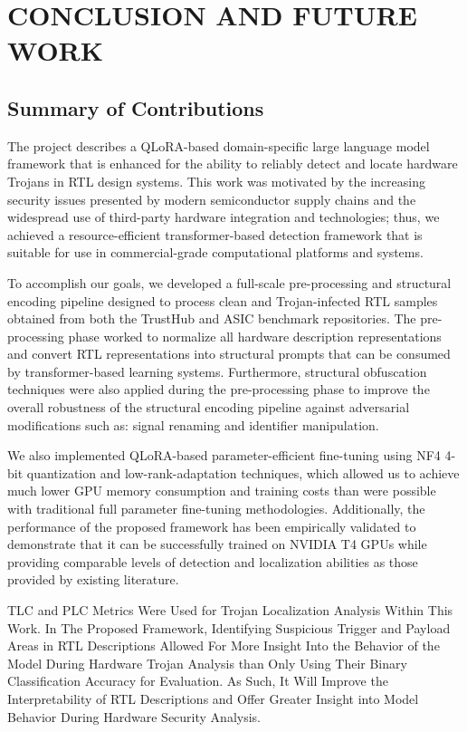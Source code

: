 \documentclass[12pt,a4paper]{report}
\begin{document}
\chapter{CONCLUSION AND FUTURE WORK}

\section{Summary of Contributions}

The project describes a QLoRA-based domain-specific large language model framework that is enhanced for the ability to reliably detect and locate hardware Trojans in RTL design systems. This work was motivated by the increasing security issues presented by modern semiconductor supply chains and the widespread use of third-party hardware integration and technologies; thus, we achieved a resource-efficient transformer-based detection framework that is suitable for use in commercial-grade computational platforms and systems.

To accomplish our goals, we developed a full-scale pre-processing and structural encoding pipeline designed to process clean and Trojan-infected RTL samples obtained from both the TrustHub and ASIC benchmark repositories. The pre-processing phase worked to normalize all hardware description representations and convert RTL representations into structural prompts that can be consumed by transformer-based learning systems. Furthermore, structural obfuscation techniques were also applied during the pre-processing phase to improve the overall robustness of the structural encoding pipeline against adversarial modifications such as: signal renaming and identifier manipulation.

We also implemented QLoRA-based parameter-efficient fine-tuning using NF4 4-bit quantization and low-rank-adaptation techniques, which allowed us to achieve much lower GPU memory consumption and training costs than were possible with traditional full parameter fine-tuning methodologies. Additionally, the performance of the proposed framework has been empirically validated to demonstrate that it can be successfully trained on NVIDIA T4 GPUs while providing comparable levels of detection and localization abilities as those provided by existing literature.

TLC and PLC Metrics Were Used for Trojan Localization Analysis Within This Work. In The Proposed Framework, Identifying Suspicious Trigger and Payload Areas in RTL Descriptions Allowed For More Insight Into the Behavior of the Model During Hardware Trojan Analysis than Only Using Their Binary Classification Accuracy for Evaluation. As Such, It Will Improve the Interpretability of RTL Descriptions and Offer Greater Insight into Model Behavior During Hardware Security Analysis.
\end{document}
